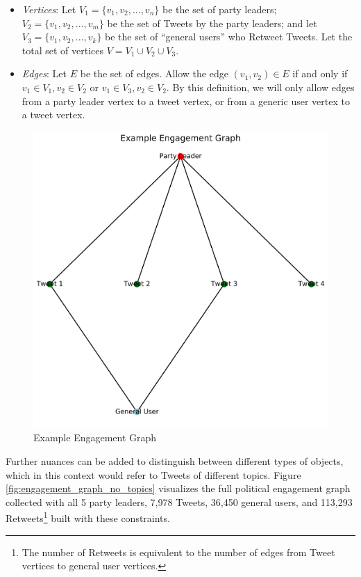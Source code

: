 \documentclass{nws}
\begin{document}
\begin{itemize}
  \item \emph{Vertices}: Let $V_{1}=\{v_{1},v_{2},...,v_{n}\}$ be the set of
  party leaders; $V_{2}=\{v_{1},v_{2},...,v_{m}\}$ be the set of Tweets by the
  party leaders; and let
  $V_{3}=\{v_{1},v_{2},...,v_{k}\}$ be the set of ``general users'' who
  Retweet Tweets. Let the total set of vertices $V=V_{1}\cup V_{2}\cup V_{3}$.
  
  \item \emph{Edges}: Let $E$ be the set of edges. Allow the edge $(v_{1},
  v_{2})\in E$ if and only if $v_{1}\in V_{1}, v_{2}\in V_{2}$ or $v_{1}\in
  V_{3}, v_{2}\in V_{2}$. By this definition, we will only allow edges from a
  party leader vertex to a tweet vertex, or from a generic user vertex to a
  tweet vertex.
\end{itemize}

\begin{figure}[h!]
  \centering
  \includegraphics[scale=0.2]{figures/ex_engagement_graph}
  \caption[Example Engagement Graph]{Example Engagement Graph}
  \label{fig:ex_engagement_graph}
\end{figure}

Further nuances can be added to distinguish between different types of objects,
which in this context would refer to Tweets of different topics. Figure
\ref{fig:engagement_graph_no_topics}  visualizes the full political engagement
graph collected with all 5 party leaders, 7,978 Tweets, 36,450 general users,
and 113,293 Retweets\footnote{The number of Retweets is equivalent to the number
of edges from Tweet vertices to general user vertices.} built with these constraints.
\end{document}
